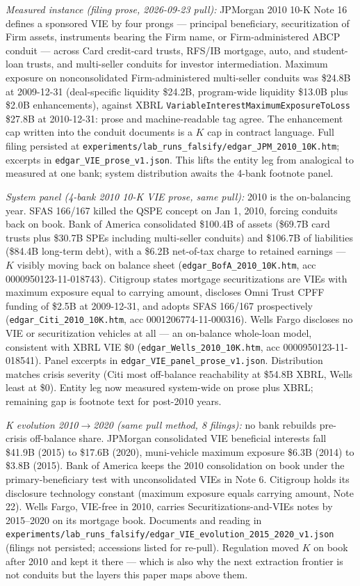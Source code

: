 \documentclass[11pt]{article}
\begin{document}
\textit{Measured instance (filing prose, 2026-09-23 pull):} JPMorgan 2010 10-K Note 16 defines a sponsored VIE by four prongs --- principal beneficiary, securitization of Firm assets, instruments bearing the Firm name, or Firm-administered ABCP conduit --- across Card credit-card trusts, RFS/IB mortgage, auto, and student-loan trusts, and multi-seller conduits for investor intermediation. Maximum exposure on nonconsolidated Firm-administered multi-seller conduits was \$24.8B at 2009-12-31 (deal-specific liquidity \$24.2B, program-wide liquidity \$13.0B plus \$2.0B enhancements), against XBRL \texttt{VariableInterestMaximumExposureToLoss} \$27.8B at 2010-12-31: prose and machine-readable tag agree. The enhancement cap written into the conduit documents is a $K$ cap in contract language. Full filing persisted at \texttt{experiments/lab\_runs\_falsify/edgar\_JPM\_2010\_10K.htm}; excerpts in \texttt{edgar\_VIE\_prose\_v1.json}. This lifts the entity leg from analogical to measured at one bank; system distribution awaits the 4-bank footnote panel.

\textit{System panel (4-bank 2010 10-K VIE prose, same pull):} 2010 is the on-balancing year. SFAS 166/167 killed the QSPE concept on Jan 1, 2010, forcing conduits back on book. Bank of America consolidated \$100.4B of assets (\$69.7B card trusts plus \$30.7B SPEs including multi-seller conduits) and \$106.7B of liabilities (\$84.4B long-term debt), with a \$6.2B net-of-tax charge to retained earnings --- $K$ visibly moving back on balance sheet (\texttt{edgar\_BofA\_2010\_10K.htm}, acc 0000950123-11-018743). Citigroup states mortgage securitizations are VIEs with maximum exposure equal to carrying amount, discloses Omni Trust CPFF funding of \$2.5B at 2009-12-31, and adopts SFAS 166/167 prospectively (\texttt{edgar\_Citi\_2010\_10K.htm}, acc 0001206774-11-000316). Wells Fargo discloses no VIE or securitization vehicles at all --- an on-balance whole-loan model, consistent with XBRL VIE \$0 (\texttt{edgar\_Wells\_2010\_10K.htm}, acc 0000950123-11-018541). Panel excerpts in \texttt{edgar\_VIE\_panel\_prose\_v1.json}. Distribution matches crisis severity (Citi most off-balance reachability at \$54.8B XBRL, Wells least at \$0). Entity leg now measured system-wide on prose plus XBRL; remaining gap is footnote text for post-2010 years.

\textit{K evolution 2010$\to$2020 (same pull method, 8 filings):} no bank rebuilds pre-crisis off-balance share. JPMorgan consolidated VIE beneficial interests fall \$41.9B (2015) to \$17.6B (2020), muni-vehicle maximum exposure \$6.3B (2014) to \$3.8B (2015). Bank of America keeps the 2010 consolidation on book under the primary-beneficiary test with unconsolidated VIEs in Note 6. Citigroup holds its disclosure technology constant (maximum exposure equals carrying amount, Note 22). Wells Fargo, VIE-free in 2010, carries Securitizations-and-VIEs notes by 2015--2020 on its mortgage book. Documents and reading in \texttt{experiments/lab\_runs\_falsify/edgar\_VIE\_evolution\_2015\_2020\_v1.json} (filings not persisted; accessions listed for re-pull). Regulation moved $K$ on book after 2010 and kept it there --- which is also why the next extraction frontier is not conduits but the layers this paper maps above them.
\end{document}
